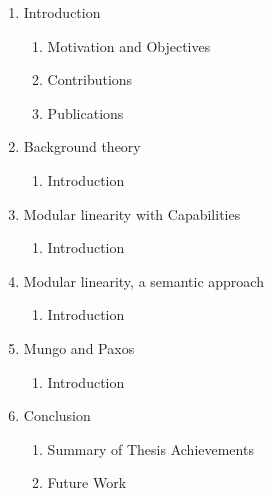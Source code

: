 
\begin{enumerate}
  \item Introduction
  \begin{enumerate}
    \item Motivation and Objectives
    \item Contributions
    \item Publications
  \end{enumerate}
  \item Background theory
  \begin{enumerate}
    \item Introduction
  \end{enumerate}
  \item Modular linearity with Capabilities
  \begin{enumerate}
    \item Introduction
  \end{enumerate}
  \item Modular linearity, a semantic approach
  \begin{enumerate}
    \item Introduction
  \end{enumerate}
  \item Mungo and Paxos
  \begin{enumerate}
    \item Introduction
  \end{enumerate}
  \item Conclusion
  \begin{enumerate}
    \item Summary of Thesis Achievements
    \item Future Work
  \end{enumerate}
\end{enumerate}

